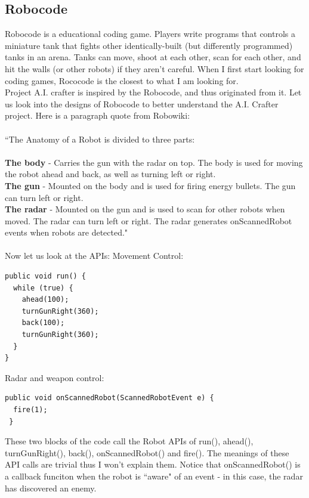 \documentclass[12pt]{article}
\begin{document}
\subsection{Robocode}
Robocode is a educational coding game. Players write programs that controls a miniature tank that fights other identically-built (but differently programmed) tanks in an arena. Tanks can move, shoot at each other, scan for each other, and hit the walls (or other robots) if they aren't careful. When I first start looking for coding games, Rococode is the closest to what I am looking for.\\

Project A.I. crafter is inspired by the Robocode, and thus originated from it. Let us look into the designs of Robocode to better understand the A.I. Crafter project. Here is a paragraph quote from Robowiki:\cite{robowiki1} \\\\
``The Anatomy of a Robot is divided to three parts:\\\\
{\bf The body} - Carries the gun with the radar on top. The body is used for moving the robot ahead and back, as well as turning left or right.\\
{\bf The gun} - Mounted on the body and is used for firing energy bullets. The gun can turn left or right.\\
{\bf The radar} - Mounted on the gun and is used to scan for other robots when moved. The radar can turn left or right. The radar generates onScannedRobot events when robots are detected."\\\\
Now let us look at the APIs:\newline
Movement Control:
\begin{verbatim}
public void run() {
  while (true) {
    ahead(100);
    turnGunRight(360);
    back(100);
    turnGunRight(360);
  }
}
\end{verbatim}
\vspace{25pt}
Radar and weapon control:
\begin{verbatim}
public void onScannedRobot(ScannedRobotEvent e) {
  fire(1);
 }
\end{verbatim}

These two blocks of the code call the Robot APIs of run(), ahead(), turnGunRight(), back(), onScannedRobot() and fire(). The meanings of these API calls are trivial thus I won't explain them. Notice that onScannedRobot() is a callback funciton when the robot is ``aware" of an event - in this case, the radar has discovered an enemy.\\ 
\end{document}

